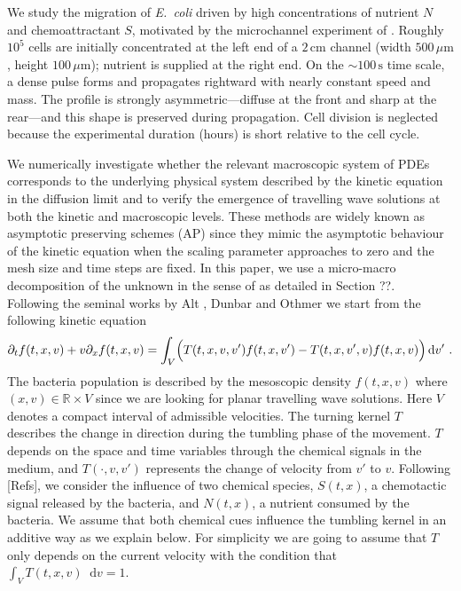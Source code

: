 \documentclass[11pt,twoside]{article}
\theoremstyle{nonumberplain}
\newcommand*\diff{\mathop{}\!\mathrm{d}}
\begin{document}
We study the migration of \textit{E.~coli} driven by high concentrations of nutrient $N$ and chemoattractant $S$, motivated by the microchannel experiment of \cite{saragosti2010mathematical}. Roughly $10^5$ cells are initially concentrated at the left end of a $2\,\mathrm{cm}$ channel (width $500\,\mu\mathrm{m}$, height $100\,\mu\mathrm{m}$); nutrient is supplied at the right end. On the $\sim 100\,\mathrm{s}$ time scale, a dense pulse forms and propagates rightward with nearly constant speed and mass. The profile is strongly asymmetric—diffuse at the front and sharp at the rear—and this shape is preserved during propagation. Cell division is neglected because the experimental duration (hours) is short relative to the cell cycle.


We numerically investigate whether the relevant macroscopic system of PDEs corresponds to the underlying physical system described by the kinetic equation {in the diffusion limit} and to verify the emergence of travelling wave solutions at both the kinetic and macroscopic levels. These methods are widely known as asymptotic preserving schemes (AP) \cite{filbet2010class,jin1999efficient} since they mimic the asymptotic behaviour of the kinetic equation when the scaling parameter approaches to zero and the mesh size and time steps are fixed. In this paper, we use a micro-macro decomposition of the unknown in the sense of  \cite{lemou2008new} as detailed in Section ??.\\




Following the seminal works by Alt \cite{alt1980biased}, Dunbar and Othmer \cite{othmer1988models}  we start from the following kinetic equation 
\begin{equation}
    \partial_t f(t,x,v)+{v}\partial_x f(t,x,v)= \int_{V}\Bigl(T(t,x,v,v')f(t,x,v')-  T(t,x,{v}',v)f(t,x,v)\Bigr)\diff v'\ .\label{eq: main kinetic}
\end{equation}
The bacteria population is described by the mesoscopic density $f(t,x,v)$ where $(x,v)\in\mathbb{R}\times V$ since we are looking for planar travelling wave solutions. Here $V$ denotes a compact interval of admissible velocities. The turning kernel $T$ describes the change in direction during the tumbling phase of the movement. $T$ depends on the space and time variables through the chemical signals in the medium,  and $T(\cdot, v,v')$ represents the change of velocity from $v'$ to $v$. Following [Refs], we consider the influence of two chemical species, $S(t,x)$, a chemotactic signal released by the bacteria, and $N(t,x)$, a nutrient consumed by the bacteria. We assume that both chemical cues influence the tumbling kernel in an additive way as we explain below. For simplicity we are going to assume that $T$ only depends on the current velocity with the condition that $\int_VT(t,x,v)\diff v=1$.
\end{document}
